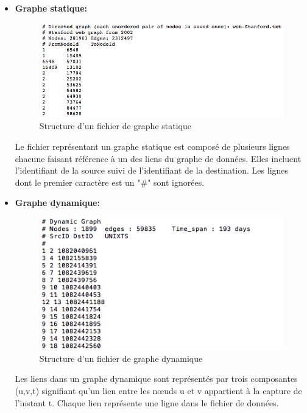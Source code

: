 	\begin{itemize}[label=$\bullet$]
	\item \textbf{Graphe statique:}
	
	\begin{figure}[H]
	\centering
	
	\includegraphics[scale=0.65]{ressources/image/statiqugr.png}
	\caption{Structure d'un fichier de graphe statique}
	\label{Img:statiqugr}
 \end{figure}
	
	Le fichier représentant un graphe statique est composé de plusieurs lignes chacune faisant référence à un des liens du graphe de données. Elles incluent l'identifiant de la source suivi de  l'identifiant de la destination. Les lignes dont le premier caractère est un "\#" sont ignorées.
	\item \textbf{Graphe dynamique: } 
	
	\begin{figure}[H]
	
	
	\includegraphics[scale=0.7]{ressources/image/dynamiqgr.png}
	\caption{Structure d'un fichier de graphe dynamique}
	\label{Img:dynamiqgr}
 \end{figure}
Les liens dans un graphe dynamique sont représentés par trois composantes (u,v,t)	signifiant qu'un lien entre les nœuds u et v appartient à la capture de l'instant t. Chaque lien représente une ligne dans le fichier de données.
	

\end{itemize}
